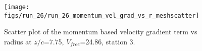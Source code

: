 \begin{figure}[H]
\centering
\texttt{[image: figs/run\_26/run\_26\_momentum\_vel\_grad\_vs\_r\_meshscatter]}
\caption{Scatter plot of the momentum based velocity gradient term vs radius at $z/c$=7.75, $V_{free}$=24.86, station 3.}
\label{fig:run_26_momentum_vel_grad_vs_r_meshscatter}
\end{figure}


